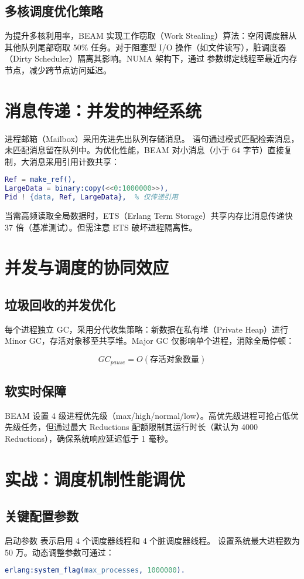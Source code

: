 \section{多核调度优化策略}
为提升多核利用率，BEAM 实现工作窃取（Work Stealing）算法：空闲调度器从其他队列尾部窃取 50\%{} 任务。对于阻塞型 I/O 操作（如文件读写），脏调度器（Dirty Scheduler）隔离其影响。NUMA 架构下，通过  参数绑定线程至最近内存节点，减少跨节点访问延迟。\par
\chapter{消息传递：并发的神经系统}
进程邮箱（Mailbox）采用先进先出队列存储消息。 语句通过模式匹配检索消息，未匹配消息留在队列中。为优化性能，BEAM 对小消息（小于 64 字节）直接复制，大消息采用引用计数共享：\par
\begin{lstlisting}[language=erlang]
% 大消息传递优化（引用计数）
Ref = make_ref(),
LargeData = binary:copy(<<0:1000000>>),
Pid ! {data, Ref, LargeData},  % 仅传递引用
\end{lstlisting}
当需高频读取全局数据时，ETS（Erlang Term Storage）共享内存比消息传递快 37 倍（基准测试）。但需注意 ETS 破坏进程隔离性。\par
\chapter{并发与调度的协同效应}
\section{垃圾回收的并发优化}
每个进程独立 GC，采用分代收集策略：新数据在私有堆（Private Heap）进行 Minor GC，存活对象移至共享堆。Major GC 仅影响单个进程，消除全局停顿：\par
$$GC_{pause} = O(存活对象数量)$$\par
\section{软实时保障}
BEAM 设置 4 级进程优先级（max/high/normal/low）。高优先级进程可抢占低优先级任务，但通过最大 Reductions 配额限制其运行时长（默认为 4000 Reductions），确保系统响应延迟低于 1 毫秒。\par
\chapter{实战：调度机制性能调优}
\section{关键配置参数}
启动参数  表示启用 4 个调度器线程和 4 个脏调度器线程。 设置系统最大进程数为 50 万。动态调整参数可通过：\par
\begin{lstlisting}[language=erlang]
% 运行时调整最大进程数
erlang:system_flag(max_processes, 1000000).
\end{lstlisting}
